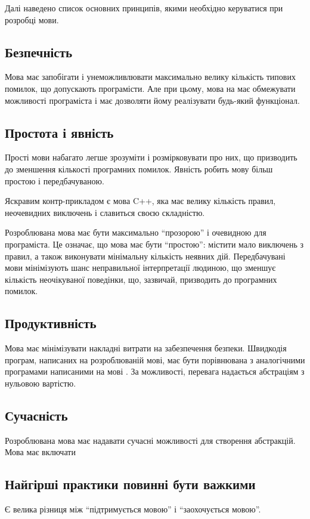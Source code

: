 \documentclass[main.tex]{subfiles}
\begin{document}
Далі наведено список основних принципів, якими необхідно керуватися при розробці мови.

\subsection{Безпечність}
Мова має запобігати і унеможливлювати максимально велику кількість типових помилок, що допускають програмісти. Але при цьому, мова на має обмежувати можливості програміста і має дозволяти йому реалізувати будь-який функціонал.

\subsection{Простота і явність}
Прості мови набагато легше зрозуміти і розмірковувати про них, що призводить до зменшення кількості програмних помилок. Явність робить мову більш простою і передбачуваною.

Яскравим контр-прикладом є мова C++, яка має велику кількість правил, неочевидних виключень і славиться своєю складністю.

Розроблювана мова має бути максимально ``прозорою'' і очевидною для програміста. Це означає, що мова має бути ``простою'': містити мало виключень з правил, а також виконувати мінімальну кількість неявних дій. Передбачувані мови мінімізують шанс неправильної інтерпретації людиною, що зменшує кількість неочікуваної поведінки, що, зазвичай, призводить до програмних помилок.

\subsection{Продуктивність}
Мова має мінімізувати накладні витрати на забезпечення безпеки. Швидкодія програм, написаних на розроблюваній мові, має бути порівнювана з аналогічними програмами написаними на мові \LangC{}.
За можливості, перевага надається абстраціям з нульовою вартістю.

\subsection{Сучасність}
Розроблювана мова має надавати сучасні можливості для створення абстракцій.
Мова має включати 

\subsection{Найгірші практики повинні бути важкими}
Є велика різниця між ``підтримується мовою'' і ``заохочується мовою''.
\end{document}
